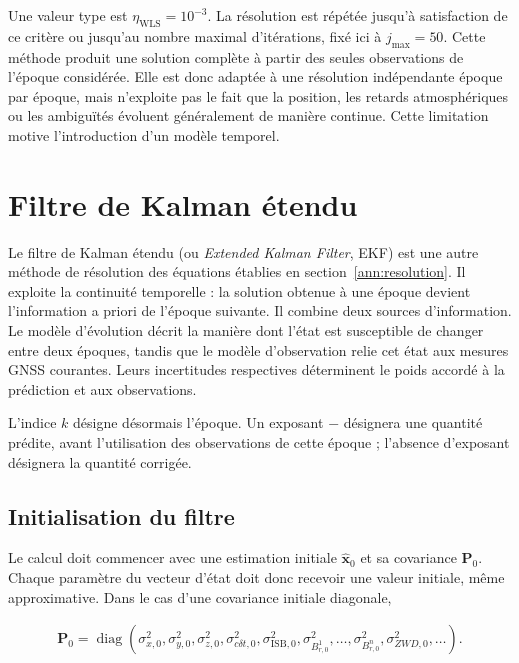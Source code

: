 Une valeur type est $\eta_{\mathrm{WLS}}=10^{-3}$. La résolution est répétée
jusqu'à satisfaction de ce critère ou jusqu'au nombre maximal d'itérations,
fixé ici à $j_{\max}=50$. Cette méthode produit une
solution complète à partir des seules observations de l'époque considérée.
Elle est donc adaptée à une résolution indépendante époque par époque, mais
n'exploite pas le fait que la position, les retards atmosphériques ou les
ambiguïtés évoluent généralement de manière continue. Cette limitation motive
l'introduction d'un modèle temporel.

\section{Filtre de Kalman étendu }
\label{ann:Kalman}

Le filtre de Kalman étendu (ou \emph{Extended Kalman Filter}, EKF) est une autre méthode de résolution des équations établies en section~\ref{ann:resolution}.
Il exploite la continuité temporelle : la solution
obtenue à une époque devient l'information a priori de l'époque suivante. Il
combine deux sources d'information. Le modèle d'évolution décrit la manière
dont l'état est susceptible de changer entre deux époques, tandis que le modèle
d'observation relie cet état aux mesures GNSS courantes. Leurs incertitudes
respectives déterminent le poids accordé à la prédiction et aux observations.

L'indice $k$
désigne désormais l'époque. Un exposant $-$ désignera une quantité prédite,
avant l'utilisation des observations de cette époque ; l'absence d'exposant
désignera la quantité corrigée.

\subsection{Initialisation du filtre}
\label{ann:sec:ekf_initialization}

Le calcul doit commencer avec une estimation initiale
$\widehat{\mathbf x}_0$ et sa covariance $\mathbf P_0$. Chaque paramètre du
vecteur d'état doit donc recevoir une valeur initiale, même approximative. Dans
le cas d'une covariance initiale diagonale,

\begin{align}
\mathbf P_0
=
\operatorname{diag}
\left(
\sigma_{x,0}^2,
\sigma_{y,0}^2,
\sigma_{z,0}^2,
\sigma_{c\delta t,0}^2,
\sigma_{\mathrm{ISB},0}^2,
\sigma_{B_{r,0}^1}^2,\ldots,
\sigma_{B_{r,0}^n}^2,
\sigma_{ZWD,0}^2,\ldots
\right).
\label{ann:eq:ekf_initial_covariance}
\end{align}

